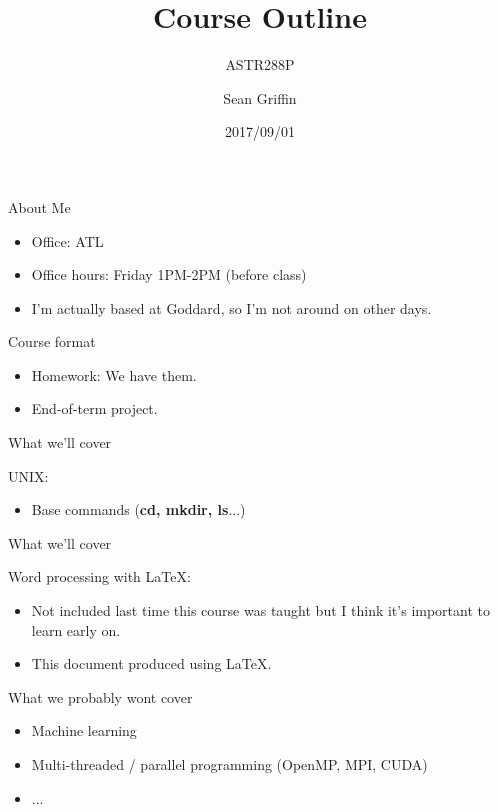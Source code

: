 \documentclass[10pt]{beamer}
\title{Course Outline}
\subtitle{ASTR288P}
\date{2017/09/01}
\author{Sean Griffin}
\institute{UMCP / NASA GSFC}
\begin{document}
\maketitle


\begin{frame}[fragile]{About Me}
\begin{itemize}
\item Office: ATL
\item Office hours: Friday 1PM-2PM (before class)
\item I'm actually based at Goddard, so I'm not around on other days.
\end{itemize}
\end{frame}

\begin{frame}[fragile]{Course format}
\begin{itemize}
\item Homework: We have them.
\item End-of-term project. 
\end{itemize}
\end{frame}

\begin{frame}[fragile]{What we'll cover}

UNIX:
\begin{itemize}
\item Base commands (\textbf{cd, mkdir, ls}...)
\end{itemize}


\end{frame}

\begin{frame}[fragile]{What we'll cover}

Word processing with \LaTeX:
\begin{itemize}
\item Not included last time this course was taught but I think it's important to learn early on.
\item This document produced using \LaTeX.
\end{itemize}


\end{frame}

\begin{frame}[fragile]{What we probably wont cover}

\begin{itemize}
\item Machine learning
\item Multi-threaded / parallel programming (OpenMP, MPI, CUDA)
\item ...
\end{itemize}


\end{frame}
\end{document}
